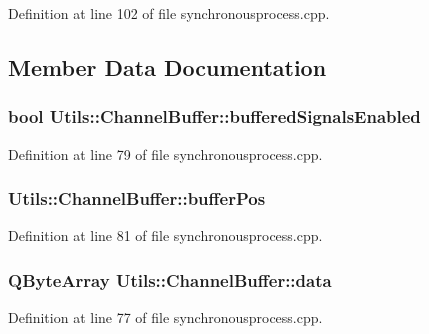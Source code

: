 Definition at line 102 of file synchronousprocess.\-cpp.



\subsection{Member Data Documentation}
\hypertarget{struct_utils_1_1_channel_buffer_a604565db9d7f8ee949013e67140d4dbf}{
\subsubsection[{buffered\-Signals\-Enabled}]{\setlength{\rightskip}{0pt plus 5cm}bool Utils\-::\-Channel\-Buffer\-::buffered\-Signals\-Enabled}}\label{struct_utils_1_1_channel_buffer_a604565db9d7f8ee949013e67140d4dbf}


Definition at line 79 of file synchronousprocess.\-cpp.

\hypertarget{struct_utils_1_1_channel_buffer_aa968a408a1f0a7cfa1dc83c2ea665ef5}{
\subsubsection[{buffer\-Pos}]{ Utils\-::\-Channel\-Buffer\-::buffer\-Pos}}\label{struct_utils_1_1_channel_buffer_aa968a408a1f0a7cfa1dc83c2ea665ef5}


Definition at line 81 of file synchronousprocess.\-cpp.

\hypertarget{struct_utils_1_1_channel_buffer_aec15c168afb035f27ef4cefc5825ac66}{
\subsubsection[{data}]{\setlength{\rightskip}{0pt plus 5cm}Q\-Byte\-Array Utils\-::\-Channel\-Buffer\-::data}}\label{struct_utils_1_1_channel_buffer_aec15c168afb035f27ef4cefc5825ac66}


Definition at line 77 of file synchronousprocess.\-cpp.

